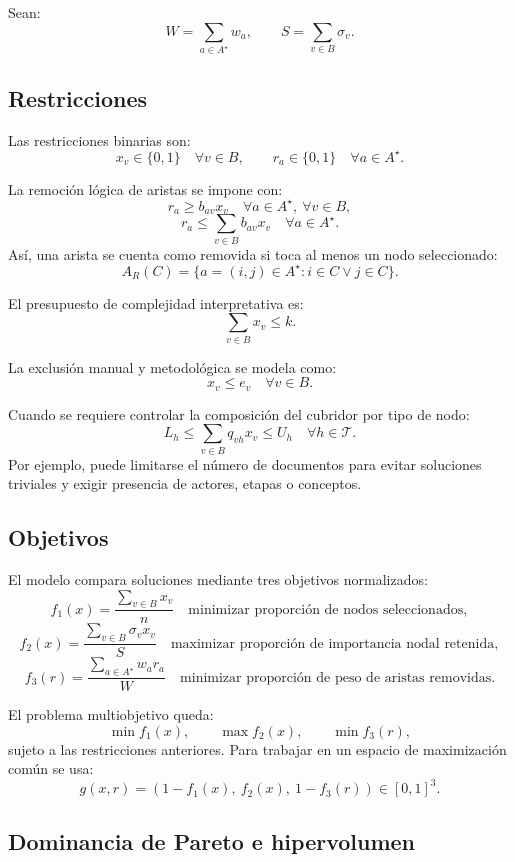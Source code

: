 \documentclass[11pt]{article}
\begin{document}
Sean:
\[
W=\sum_{a\in A^\star}w_a,\qquad
S=\sum_{v\in B}\sigma_v.
\]

\subsection{Restricciones}

Las restricciones binarias son:
\[
x_v\in\{0,1\}\quad \forall v\in B,\qquad
r_a\in\{0,1\}\quad \forall a\in A^\star.
\]

La remoción lógica de aristas se impone con:
\[
r_a \geq b_{av}x_v
\quad \forall a\in A^\star,\ \forall v\in B,
\]
\[
r_a \leq \sum_{v\in B} b_{av}x_v
\quad \forall a\in A^\star.
\]
Así, una arista se cuenta como removida si toca al menos un nodo seleccionado:
\[
A_R(C)=\{a=(i,j)\in A^\star:i\in C \lor j\in C\}.
\]

El presupuesto de complejidad interpretativa es:
\[
\sum_{v\in B}x_v \leq k.
\]

La exclusión manual y metodológica se modela como:
\[
x_v\leq e_v\quad \forall v\in B.
\]

Cuando se requiere controlar la composición del cubridor por tipo de nodo:
\[
L_h \leq \sum_{v\in B}q_{vh}x_v \leq U_h
\quad \forall h\in{\mathcal T}.
\]
Por ejemplo, puede limitarse el número de documentos para evitar soluciones
triviales y exigir presencia de actores, etapas o conceptos.

\subsection{Objetivos}

El modelo compara soluciones mediante tres objetivos normalizados:
\[
f_1(x)=\frac{\sum_{v\in B}x_v}{n}
\quad \text{minimizar proporción de nodos seleccionados},
\]
\[
f_2(x)=\frac{\sum_{v\in B}\sigma_v x_v}{S}
\quad \text{maximizar proporción de importancia nodal retenida},
\]
\[
f_3(r)=\frac{\sum_{a\in A^\star}w_a r_a}{W}
\quad \text{minimizar proporción de peso de aristas removidas}.
\]

El problema multiobjetivo queda:
\[
\min f_1(x),\qquad \max f_2(x),\qquad \min f_3(r),
\]
sujeto a las restricciones anteriores. Para trabajar en un espacio de
maximización común se usa:
\[
g(x,r)=\left(1-f_1(x),\ f_2(x),\ 1-f_3(r)\right)\in[0,1]^3.
\]

\subsection{Dominancia de Pareto e hipervolumen}
\end{document}
